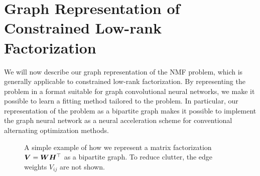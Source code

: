 \documentclass{article}
\begin{document}
\section{Graph Representation of Constrained Low-rank Factorization}\label{sec:graph_representation}
We will now describe our graph representation of the NMF problem, which is generally applicable to constrained low-rank factorization. By representing the problem in a format suitable for graph convolutional neural networks, we make it possible to learn a fitting method tailored to the problem. In particular, our representation of the problem as a bipartite graph makes it possible to implement the graph neural network as a neural acceleration scheme for conventional alternating optimization methods. %
\begin{figure}
\centering
{}
\caption{A simple example of how we represent a matrix factorization ${\bm{V}}={\bm{W}}{\bm{H}}^\top  $ as a bipartite graph. To reduce clutter, the edge weights $V_{ij}$ are not shown.} \label{fig:factorizedGraph}
\end{figure}
\end{document}
